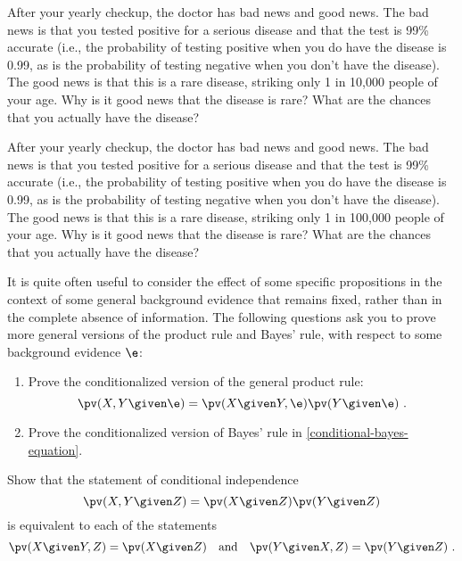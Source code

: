 \begin{uexercise}
After your yearly checkup, the doctor has bad news and good news.  The
bad news is that you tested positive for a serious disease and that
the test is 99\% accurate (i.e., the probability of testing positive
when you do have the disease is 0.99, as is the probability of testing
negative when you don't have the disease).  The good news is
that this is a rare disease, striking only 1 in 10,000 people of
your age.  Why is it good news that the disease is rare?  What are the
chances that you actually have the disease?
\end{uexercise} 

\begin{iexercise}
After your yearly checkup, the doctor has bad news and good news.  The
bad news is that you tested positive for a serious disease and that
the test is 99\% accurate (i.e., the probability of testing positive
when you do have the disease is 0.99, as is the probability of testing
negative when you don't have the disease).  The good news is
that this is a rare disease, striking only 1 in 100,000 people of
your age.  Why is it good news that the disease is rare?  What are the
chances that you actually have the disease?
\end{iexercise} 

\begin{exercise}%
It is quite often useful to consider the effect of some specific propositions
in the context of some general background evidence that remains fixed, rather
than in the complete absence of information.  The following questions ask you
to prove more general versions of the product rule and Bayes' rule, with
respect to some background evidence \(\e\):
\begin{enumerate}
\item Prove the conditionalized version of the general product rule:
\[\pv(X,Y \given \e) = \pv(X\given Y,\e) \pv(Y\given\e)\ .\]
\item Prove the conditionalized version of Bayes' rule in \eqref{conditional-bayes-equation}.
\end{enumerate}
\end{exercise} 

\begin{exercise}
Show that the statement of conditional independence
\[\pv(X,Y \given Z) = \pv(X\given Z) \pv(Y\given Z)\]
is equivalent to each of the statements
\[ \pv(X\given Y,Z) = \pv(X\given Z) \quad\mbox{and}\quad \pv(Y\given X,Z) = \pv(Y\given Z)\ . \]
\end{exercise} 

